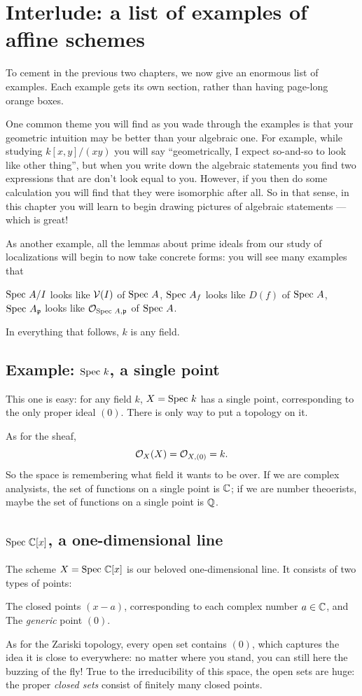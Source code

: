 \chapter{Interlude: a list of examples of affine schemes}
\label{ch:spec_examples}
To cement in the previous two chapters,
we now give an enormous list of examples.
Each example gets its own section,
rather than having page-long orange boxes.

One common theme you will find as you wade through
the examples is that your geometric intuition may
be better than your algebraic one.
For example, while studying $k[x,y] / (xy)$ you will say
``geometrically, I expect so-and-so to look like other thing'',
but when you write down the algebraic statements
you find two expressions that are don't look equal to you.
However, if you then do some calculation you will
find that they were isomorphic after all.
So in that sense, in this chapter you will learn to begin drawing
pictures of algebraic statements --- which is great!

As another example, all the lemmas about
prime ideals from our study of localizations
will begin to now take concrete forms:
you will see many examples that
\begin{itemize}
	\ii $\text{Spec } A/I$ looks like $\mathcal V(I)$ of $\text{Spec } A$,
	\ii $\text{Spec } A_f$ looks like $D(f)$ of $\text{Spec } A$,
	\ii $\text{Spec } A_\mathfrak p$ looks like $\mathcal O_{\text{Spec } A, \mathfrak p}$ of $\text{Spec } A$.
\end{itemize}

In everything that follows, $k$ is any field.

\section{Example: $\text{Spec } k$, a single point}
This one is easy: for any field $k$,
$X = \text{Spec } k$ has a single point,
corresponding to the only proper ideal $(0)$.
There is only way to put a topology on it.

As for the sheaf,
\[ \mathcal O_X(X) = \mathcal O_{X,(0)} = k. \]
So the space is remembering what field it wants to be over.
If we are complex analysists,
the set of functions on a single point is $\mathbb C$;
if we are number theoerists,
maybe the set of functions on a single point is $\mathbb Q$.

\section{$\text{Spec } \mathbb C[x]$, a one-dimensional line}
The scheme $X = \text{Spec } \mathbb C[x]$ is our beloved one-dimensional line.
It consists of two types of points:
\begin{itemize}
	\ii The closed points $(x-a)$, corresponding to each
	complex number $a \in \mathbb C$, and
	\ii The \emph{generic} point $(0)$.
\end{itemize}
As for the Zariski topology, every open set contains $(0)$,
which captures the idea it is close to everywhere:
no matter where you stand, you can still here the buzzing of the fly!
True to the irreducibility of this space,
the open sets are huge:
the proper \emph{closed sets} consist of finitely many closed points.

